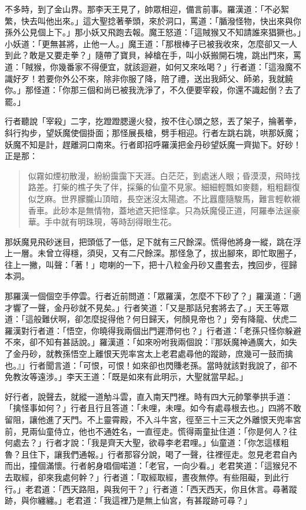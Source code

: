 不多時，到了金山界。那李天王見了，帥眾相迎，備言前事。羅漢道：「不必絮繁，快去叫他出來。」這大聖捻著拳頭，來於洞口，罵道：「腯潑怪物，快出來與你孫外公見個上下。」那小妖又飛跑去報。魔王怒道：「這賊猴又不知請誰來猖獗也。」小妖道：「更無甚將，止他一人。」魔王道：「那根棒子已被我收來，怎麼卻又一人到此？敢是又要走拳？」隨帶了寶貝，綽槍在手，叫小妖搬開石塊，跳出門來，罵道：「賊猴，你幾番家不得便宜，就該迴避，如何又來吆喝？」行者道：「這潑魔不識好歹！若要你外公不來，除非你服了降，陪了禮，送出我師父、師弟，我就饒你。」那怪道：「你那三個和尚已被我洗淨了，不久便要宰殺，你還不識起倒？去了罷。」

行者聽說「宰殺」二字，扢蹬蹬腮邊火發，按不住心頭之怒，丟了架子，掄著拳，斜行抅步，望妖魔使個掛面；那怪展長槍，劈手相迎。行者左跳右跳，哄那妖魔；妖魔不知是計，趕離洞口南來。行者即招呼羅漢把金丹砂望妖魔一齊拋下。好砂！正是那：
\begin{quote}
似霧如煙初散漫，紛紛靄靄下天涯。白茫茫，到處迷人眼；昏漠漠，飛時找路差。打柴的樵子失了伴，採藥的仙童不見家。細細輕飄如麥麵，粗粗翻復似芝麻。世界朦朧山頂暗，長空迷沒太陽遮。不比囂塵隨駿馬，難言輕軟襯香車。此砂本是無情物，蓋地遮天把怪拿。只為妖魔侵正道，阿羅奉法逞豪華。手中就有明珠現，等時刮得眼生花。
\end{quote}

那妖魔見飛砂迷目，把頭低了一低，足下就有三尺餘深。慌得他將身一縱，跳在浮上一層。未曾立得穩，須臾，又有二尺餘深。那怪急了，拔出腳來，即忙取圈子，往上一撇，叫聲：「著！」唿喇的一下，把十八粒金丹砂又盡套去，拽回步，徑歸本洞。

那羅漢一個個空手停雲。行者近前問道：「眾羅漢，怎麼不下砂了？」羅漢道：「適才響了一聲，金丹砂就不見矣。」行者笑道：「又是那話兒套將去了。」天王等眾道：「這般難伏啊，卻怎麼捉得他？何日歸天，何顏見帝也？」旁有降龍、伏虎二羅漢對行者道：「悟空，你曉得我兩個出門遲滯何也？」行者道：「老孫只怪你躲避不來，卻不知有甚話說。」羅漢道：「如來吩咐我兩個說：『那妖魔神通廣大，如失了金丹砂，就教孫悟空上離恨天兜率宮太上老君處尋他的蹤跡，庶幾可一鼓而擒也。』」行者聞言道：「可恨，可恨！如來卻也閃賺老孫。當時就該對我說了，卻不免教汝等遠涉。」李天王道：「既是如來有此明示，大聖就當早起。」

好行者，說聲去，就縱一道觔斗雲，直入南天門裡。時有四大元帥擎拳拱手道：「擒怪事如何？」行者且行且答道：「未哩，未哩。如今有處尋根去也。」四將不敢留阻，讓他進了天門。不上靈霄殿，不入斗牛宮，徑至三十三天之外離恨天兜率宮前，見兩仙童侍立，他也不通姓名，一直徑走。慌得兩童扯住道：「你是何人？往何處去？」行者才說：「我是齊天大聖，欲尋李老君哩。」仙童道：「你怎這樣粗魯？且住下，讓我們通報。」行者那容分說，喝了一聲，往裡徑走。忽見老君自內而出，撞個滿懷。行者躬身唱個喏道：「老官，一向少看。」老君笑道：「這猴兒不去取經，卻來我處何幹？」行者道：「取經取經，晝夜無停。有些阻礙，到此行行。」老君道：「西天路阻，與我何干？」行者道：「西天西天，你且休言。尋著蹤跡，與你纏纏。」老君道：「我這裡乃是無上仙宮，有甚蹤跡可尋？」

